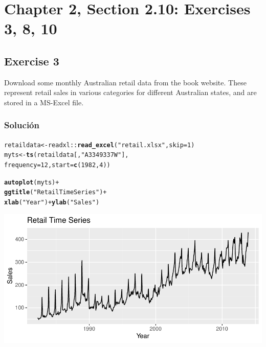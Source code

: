 \documentclass[12pt]{article}\usepackage[]{graphicx}\usepackage[]{xcolor}
\makeatletter
\def\maxwidth{ %
  \ifdim\Gin@nat@width>\linewidth
    \linewidth
  \else
    \Gin@nat@width
  \fi
}
\newcommand{\hlnum}[1]{\textcolor[rgb]{0.686,0.059,0.569}{#1}}%
\newcommand{\hlsng}[1]{\textcolor[rgb]{0.192,0.494,0.8}{#1}}%
\newcommand{\hlopt}[1]{\textcolor[rgb]{0,0,0}{#1}}%
\newcommand{\hldef}[1]{\textcolor[rgb]{0.345,0.345,0.345}{#1}}%
\newcommand{\hlkwb}[1]{\textcolor[rgb]{0.69,0.353,0.396}{#1}}%
\newcommand{\hlkwc}[1]{\textcolor[rgb]{0.333,0.667,0.333}{#1}}%
\newcommand{\hlkwd}[1]{\textcolor[rgb]{0.737,0.353,0.396}{\textbf{#1}}}%
\newenvironment{kframe}{%
 \def\at@end@of@kframe{}%
 \ifinner\ifhmode%
  \def\at@end@of@kframe{\end{minipage}}%
  \begin{minipage}{\columnwidth}%
 \fi\fi%
 \def\FrameCommand##1{\hskip\@totalleftmargin \hskip-\fboxsep
 \colorbox{shadecolor}{##1}\hskip-\fboxsep
     \hskip-\linewidth \hskip-\@totalleftmargin \hskip\columnwidth}%
 \MakeFramed {\advance\hsize-\width
   \@totalleftmargin\z@ \linewidth\hsize
   \@setminipage}}%
 {\par\unskip\endMakeFramed%
 \at@end@of@kframe}
\newenvironment{knitrout}{}{} %
\makeatother
\begin{document}
\tableofcontents


\section{Chapter 2, Section 2.10: Exercises 3, 8, 10}

\subsection{Exercise 3}

Download some monthly Australian retail data from the book website. These represent retail sales in various categories for different Australian states, and are stored in a MS-Excel file.

\subsubsection{Solución}



\begin{knitrout}
\color{fgcolor}\begin{kframe}
\begin{alltt}
\hldef{retaildata} \hlkwb{<-} \hldef{readxl}\hlopt{::}\hlkwd{read_excel}\hldef{(}\hlsng{"retail.xlsx"}\hldef{,} \hlkwc{skip}\hldef{=}\hlnum{1}\hldef{)}
\hldef{myts} \hlkwb{<-} \hlkwd{ts}\hldef{(retaildata[,}\hlsng{"A3349337W"}\hldef{],}
           \hlkwc{frequency}\hldef{=}\hlnum{12}\hldef{,} \hlkwc{start}\hldef{=}\hlkwd{c}\hldef{(}\hlnum{1982}\hldef{,}\hlnum{4}\hldef{))}

\hlkwd{autoplot}\hldef{(myts)} \hlopt{+}
  \hlkwd{ggtitle}\hldef{(}\hlsng{"Retail Time Series"}\hldef{)} \hlopt{+}
  \hlkwd{xlab}\hldef{(}\hlsng{"Year"}\hldef{)} \hlopt{+} \hlkwd{ylab}\hldef{(}\hlsng{"Sales"}\hldef{)}
\end{alltt}
\end{kframe}

{\centering \includegraphics[width=\maxwidth]{figure/unnamed-chunk-2-1} 

}


\end{knitrout}
\end{document}
